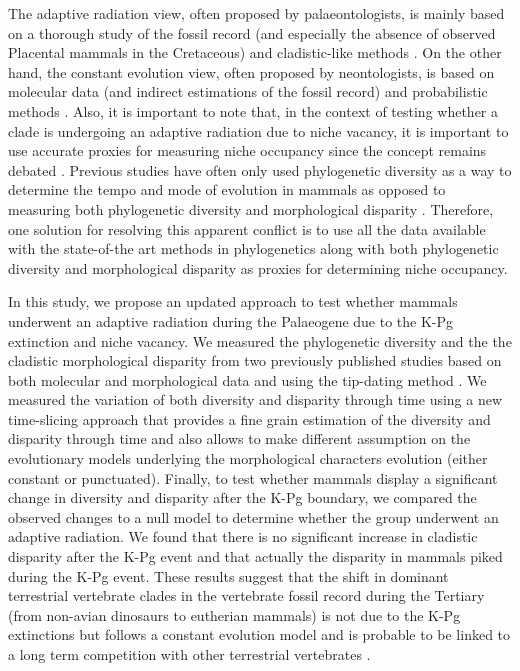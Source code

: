 \documentclass[12pt,letterpaper]{article}
\begin{document}
The adaptive radiation view, often proposed by palaeontologists, is mainly based on a thorough study of the fossil record (and especially the absence of observed Placental mammals in the Cretaceous) and cladistic-like methods \citep[e.g.][]{goswamia2011,O'Leary08022013}.%
 On the other hand, the constant evolution view, often proposed by neontologists, is based on molecular data (and indirect estimations of the fossil record) and probabilistic methods \citep[e.g.][]{bininda-emondsthe2007,Stadler12042011,meredithimpacts2011}. Also, it is important to note that, in the context of testing whether a clade is undergoing an adaptive radiation due to niche vacancy, it is important to use accurate proxies for measuring niche occupancy since the concept remains debated \citep{Pearman2008149}. Previous studies have often only used phylogenetic diversity as a way to determine the tempo and mode of evolution in mammals \citep[e.g.][]{Stadler12042011} as opposed to measuring both phylogenetic diversity and morphological disparity \citep{slaterCetacean,ruta2013,hopkinsdecoupling2013}. Therefore, one solution for resolving this apparent conflict is to use all the data available with the state-of-the art methods in phylogenetics along with both phylogenetic diversity and morphological disparity as proxies for determining niche occupancy.

In this study, we propose an updated approach to test whether mammals underwent an adaptive radiation during the Palaeogene due to the K-Pg extinction and niche vacancy. We measured the phylogenetic diversity and the the cladistic morphological disparity from two previously published studies \citep{MEE3:MEE312084,beckancient2014} based on both molecular and morphological data and using the tip-dating method \citep{ronquista2012}. We measured the variation of both diversity and disparity through time using a new time-slicing approach that provides a fine grain estimation of the diversity and disparity through time and also allows to make different assumption on the evolutionary models underlying the morphological characters evolution (either constant or punctuated). Finally, to test whether mammals display a significant change in diversity and disparity after the K-Pg boundary, we compared the observed changes to a null model to determine whether the group underwent an adaptive radiation. We found that there is no significant increase in cladistic disparity after the K-Pg event and that actually the disparity in mammals piked during the K-Pg event. These results suggest that the shift in dominant terrestrial vertebrate clades in the vertebrate fossil record during the Tertiary (from non-avian dinosaurs to eutherian mammals) is not due to the K-Pg extinctions but follows a constant evolution model and is probable to be linked to a long term competition with other terrestrial vertebrates \citep{Brusatte12092008}.
\end{document}
